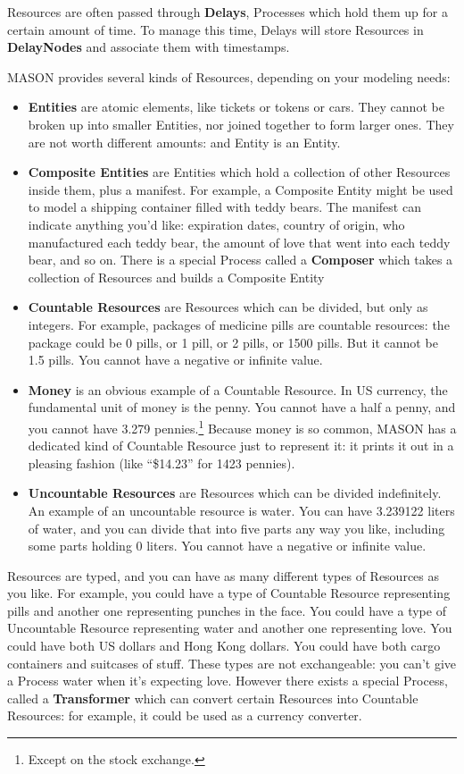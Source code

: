 \documentclass[twoside,10pt]{article}
\begin{document}
Resources are often passed through {\bf Delays}, Processes which hold them up for a certain amount of time.  To manage this time, Delays will store Resources in {\bf DelayNodes} and associate them with timestamps. 
  
MASON provides several kinds of Resources, depending on your modeling needs:

\begin{itemize}
\item {\bf Entities} are atomic elements, like tickets or tokens or cars.  They cannot be broken up into smaller Entities, nor joined together to form larger ones.  They are not worth different amounts: and Entity is an Entity.
\item {\bf Composite Entities} are Entities which hold a collection of other Resources inside them, plus a manifest.  For example, a Composite Entity might be used to model a shipping container filled with teddy bears.  The manifest can indicate anything you'd like: expiration dates, country of origin, who manufactured each teddy bear, the amount of love that went into each teddy bear, and so on.  There is a special Process called a {\bf Composer} which takes a collection of Resources and builds a Composite Entity 
\item {\bf Countable Resources} are Resources which can be divided, but only as integers.  For example, packages of medicine pills are countable resources: the package could be 0 pills, or 1 pill, or 2 pills, or 1500 pills.  But it cannot be 1.5 pills.  You cannot have a negative or infinite value.
\item {\bf Money} is an obvious example of a Countable Resource.  In US currency, the fundamental unit of money is the penny.  You cannot have a half a penny, and you cannot have 3.279 pennies.\footnote{Except on the stock exchange.}  Because money is so common, MASON has a dedicated kind of Countable Resource just to represent it: it prints it out in a pleasing fashion (like ``\$14.23'' for 1423 pennies). 
\item {\bf Uncountable Resources} are Resources which can be divided indefinitely.  An example of an uncountable resource is water.  You can have 3.239122 liters of water, and you can divide that into five parts any way you like, including some parts holding 0 liters.  You cannot have a negative or infinite value.
\end{itemize}

Resources are typed, and you can have as many different types of Resources as you like.  For example, you could have a type of Countable Resource representing pills and another one representing punches in the face.  You could have a type of Uncountable Resource representing water and another one representing love.  You could have both US dollars and Hong Kong dollars.  You could have both cargo containers and suitcases of stuff.  These types are not exchangeable: you can't give a Process water when it's expecting love.  However there exists a special Process, called a {\bf Transformer} which can convert certain Resources into Countable Resources: for example, it could be used as a currency converter.     
\end{document}
